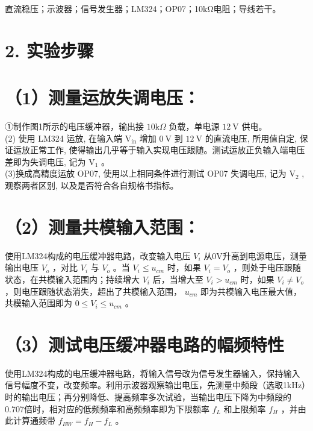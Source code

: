 \documentclass[
  10
]{article}
\begin{document}
直流稳压；示波器；信号发生器；LM324；OP07；10kΩ电阻；导线若干。

\section{2. 实验步骤}\label{ux5b9eux9a8cux6b65ux9aa4-1}

\section{（1）测量运放失调电压：}\label{ux6d4bux91cfux8fd0ux653eux5931ux8c03ux7535ux538b}

①制作图1所示的电压缓冲器，输出接 \(10 \mathrm{k} \Omega\) 负载，单电源
\(12 \mathrm{~V}\) 供电。\\
(2) 使用 LM324 运放, 在输入端 \(\mathrm{V}_{\mathrm{in}}\) 增加
\(0 \mathrm{~V}\) 到 \(12 \mathrm{~V}\) 的直流电压, 所用值自定,
保证运放正常工作,
使得输出几乎等于输入实现电压跟随。测试运放正负输入端电压差即为失调电压,
记为 \(\mathrm{V}_{1}\) 。\\
(3)换成高精度运放 OP07, 使用以上相同条件进行测试 OP07 失调电压, 记为
\(\mathrm{V}_{2}\) , 观察两者区别, 以及是否符合各自规格书指标。

\section{（2）测量共模输入范围：}\label{ux6d4bux91cfux5171ux6a21ux8f93ux5165ux8303ux56f4}

使用LM324构成的电压缓冲器电路，改变输入电压 \(V_{i}\)
从0V升高到电源电压，测量输出电压 \(V_{o}\) ，对比 \(V_{i}\) 与 \(V_{o}\)
。当 \(V_{i} \leq u_{cm}\) 时，如果 \(V_{i} = V_{o}\)
，则处于电压跟随状态，在共模输入范围内；持续增大 \(V_{i}\) 后，当增大至
\(V_{i} > u_{cm}\) 时，如果 \(V_{i} \neq V_{o}\)
，则电压跟随状态消失，超出了共模输入范围， \(u_{cm}\)
即为共模输入电压最大值，共模输入范围即为 \(0 \leq V_{i} \leq u_{cm}\) 。

\section{（3）测试电压缓冲器电路的幅频特性}\label{ux6d4bux8bd5ux7535ux538bux7f13ux51b2ux5668ux7535ux8defux7684ux5e45ux9891ux7279ux6027}

使用LM324构成的电压缓冲器电路，将输入信号改为信号发生器输入，保持输入信号幅度不变，改变频率。利用示波器观察输出电压，先测量中频段（选取1kHz）时的输出电压；再分别降低、提高频率多次试验，当输出电压下降为中频段的0.707倍时，相对应的低频频率和高频频率即为下限额率
\(f_{L}\) 和上限频率 \(f_{H}\) ，并由此计算通频带
\(f_{BW} = f_{H} - f_{L}\) 。
\end{document}
